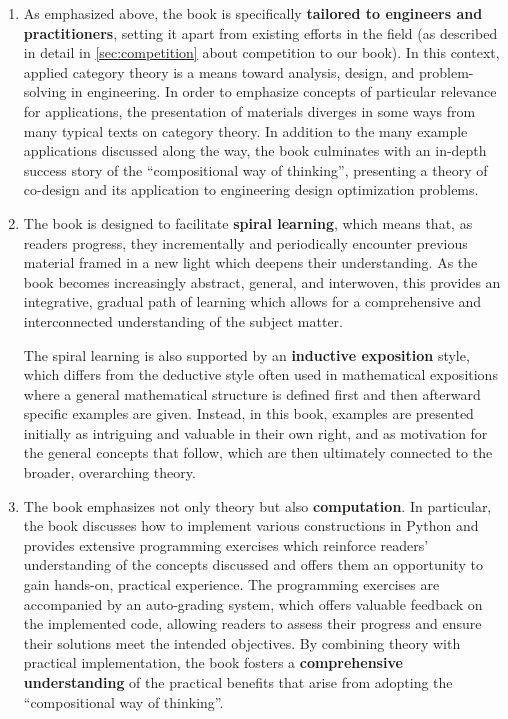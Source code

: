 \documentclass[10pt, article, one side]{memoir}
\begin{document}
    \begin{enumerate}
        \item As emphasized above, the book is specifically \textbf{tailored to engineers and practitioners}, setting it apart from existing efforts in the field (as described in detail in \cref{sec:competition} about competition to our book).
              In this context, applied category theory is a means toward analysis, design, and problem-solving in engineering.
              In order to emphasize concepts of particular relevance for applications, the presentation of materials diverges in some ways from many typical texts on category theory.
              In addition to the many example applications discussed along the way, the book culminates with an in-depth success story of the “compositional way of thinking”, presenting a theory of co-design and its application to engineering design optimization problems.

        \item
              The book is designed to facilitate \textbf{spiral learning}, which means that, as readers progress, they incrementally and periodically encounter previous material framed in a new light which deepens their understanding.
              As the book becomes increasingly abstract, general, and interwoven, this provides an integrative, gradual path of learning which allows for a comprehensive and interconnected understanding of the subject matter.

              The spiral learning is also supported by an \textbf{inductive exposition} style, which differs from the deductive style often used in mathematical expositions where a general mathematical structure is defined first and then afterward specific examples are given.
              Instead, in this book, examples are presented initially as intriguing and valuable in their own right, and as motivation for the general concepts that follow, which are then ultimately connected to the broader, overarching theory.

        \item The book emphasizes not only theory but also \textbf{computation}.
              In particular, the book discusses how to implement various constructions in Python and provides extensive programming exercises which reinforce readers' understanding of the concepts discussed and offers them an opportunity to gain hands-on, practical experience.
              The programming exercises are accompanied by an auto-grading system, which offers valuable feedback on the implemented code, allowing readers to assess their progress and ensure their solutions meet the intended objectives.
              By combining theory with practical implementation, the book fosters a \textbf{comprehensive understanding} of the practical benefits that arise from adopting the ``compositional way of thinking''.


\end{enumerate}
\end{document}
